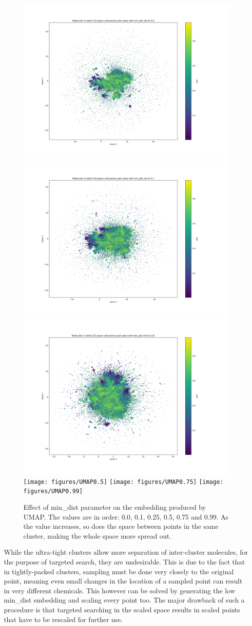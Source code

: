\begin{figure}[!h]
	\centering
	\includegraphics[width=0.49\columnwidth]{figures/UMAP0.0}
	\includegraphics[width=0.49\columnwidth]{figures/UMAP0.1}
	\includegraphics[width=0.49\columnwidth]{figures/UMAP0.25}
	\texttt{[image: figures/UMAP0.5]}
	\texttt{[image: figures/UMAP0.75]}
	\texttt{[image: figures/UMAP0.99]}
	\caption{Effect of min\_dist parameter on the embedding produced by UMAP. The values are in order: 0.0, 0.1, 0.25, 0.5, 0.75 and 0.99. As the value increases, so does the space between points in the same cluster, making the whole space more spread out.}
	\label{fig:umap:min_dist}
\end{figure}

While the ultra-tight clusters allow more separation of inter-cluster molecules, for the purpose of targeted search, they are undesirable. This is due to the fact that in tightly-packed clusters, sampling must be done very closely to the original point, meaning even small changes in the location of a sampled point can result in very different chemicals. This however can be solved by generating the low min\_dist embedding and scaling every point too. The major drawback of such a procedure is that targeted searching in the scaled space results in scaled points that have to be rescaled for further use. 


